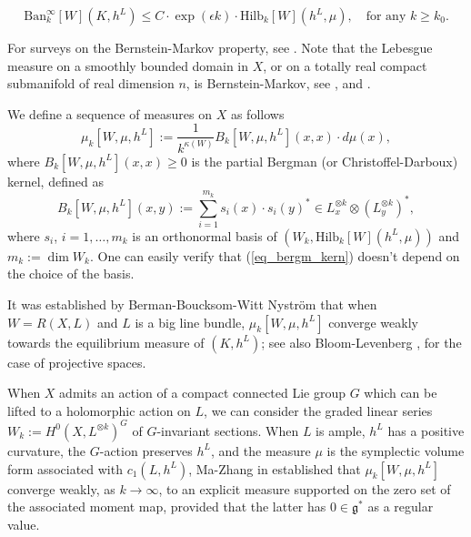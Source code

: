 \documentclass[12pt]{article}
\numberwithin{equation}{section}
\theoremstyle{theorem}
\theoremstyle{definition}
\theoremstyle{remark}
\begin{document}
	\begin{equation}\label{eq_bm_clas}
		{\textrm{Ban}}_k^{\infty}[W](K, h^L)
		\leq
		C
		\cdot
		\exp(\epsilon k)
		\cdot
		{\textrm{Hilb}}_k[W](h^L, \mu), \quad \text{for any } k \geq k_0.
	\end{equation}
	\par 
	For surveys on the Bernstein-Markov property, see \cite{BernsteinMarkovSurvey, MarinescuVuSurvey}.  
	Note that the Lebesgue measure on a smoothly bounded domain in $X$, or on a totally real compact submanifold of real dimension $n$, is Bernstein-Markov, see \cite[Corollary 1.8]{BerBoucNys}, \cite[Proposition 3.6]{BernsteinMarkovSurvey} and \cite[Theorem 1.3]{MarinescuVu}.
	\par
	We define a sequence of measures on $X$ as follows
	\begin{equation}\label{eq_mu_begmm}
		\mu_k[W, \mu, h^L] := \frac{1}{k^{\kappa(W)}} B_k[W, \mu, h^L](x, x) \cdot d \mu(x),
	\end{equation}
	where $B_k[W, \mu, h^L](x, x) \geq 0$ is the partial Bergman (or Christoffel-Darboux) kernel, defined as
	\begin{equation}\label{eq_bergm_kern}
		B_k[W, \mu, h^L](x, y) := \sum_{i = 1}^{m_k} s_i(x) \cdot s_i(y)^* \in L_x^{\otimes k} \otimes (L_y^{\otimes k})^*,
	\end{equation}
	where $s_i$, $i = 1, \ldots, m_k$ is an orthonormal basis of $(W_k, {\textrm{Hilb}}_k[W](h^L, \mu))$ and $m_k := \dim W_k$. 
	One can easily verify that (\ref{eq_bergm_kern}) doesn't depend on the choice of the basis.
	\par 
	It was established by Berman-Boucksom-Witt Nyström \cite{BerBoucNys} that when $W = R(X, L)$ and $L$ is a big line bundle, $\mu_k[W, \mu, h^L]$ converge weakly towards the equilibrium measure of $(K, h^L)$; see also Bloom-Levenberg \cite{BloomLeven1}, \cite{BloomLeven2} for the case of projective spaces.
	\par 
	When $X$ admits an action of a compact connected Lie group $G$ which can be lifted to a holomorphic action on $L$, we can consider the graded linear series $W_k := H^0(X,L^{\otimes k})^G$ of $G$-invariant sections. 
	When $L$ is ample, $h^L$ has a positive curvature, the $G$-action preserves $h^L$, and the measure $\mu$ is the symplectic volume form associated with $c_1(L, h^L)$, Ma-Zhang in \cite{MaZhBKSR} established that $\mu_k[W, \mu, h^L]$ converge weakly, as $k \to \infty$, to an explicit measure supported on the zero set of the associated moment map, provided that the latter has $0 \in \mathfrak{g}^*$ as a regular value.
\end{document}
